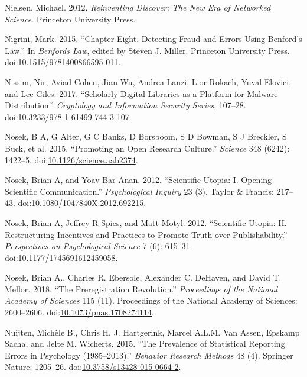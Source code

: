 \documentclass[a5paper]{book}
\begin{document}
\hypertarget{ref-isbn:9780691148908}{}
Nielsen, Michael. 2012. \emph{Reinventing Discover: The New Era of
Networked Science}. Princeton University Press.

\hypertarget{ref-doi:10.1515ux2f9781400866595-011}{}
Nigrini, Mark. 2015. ``Chapter Eight. Detecting Fraud and Errors Using
Benford's Law.'' In \emph{Benfords Law}, edited by Steven J. Miller.
Princeton University Press.
doi:\href{https://doi.org/10.1515/9781400866595-011}{10.1515/9781400866595-011}.

\hypertarget{ref-doi:10.3233ux2f978-1-61499-744-3-107}{}
Nissim, Nir, Aviad Cohen, Jian Wu, Andrea Lanzi, Lior Rokach, Yuval
Elovici, and Lee Giles. 2017. ``Scholarly Digital Libraries as a
Platform for Malware Distribution.'' \emph{Cryptology and Information
Security Series}, 107--28.
doi:\href{https://doi.org/10.3233/978-1-61499-744-3-107}{10.3233/978-1-61499-744-3-107}.

\hypertarget{ref-doi:10.1126ux2fscience.aab2374}{}
Nosek, B A, G Alter, G C Banks, D Borsboom, S D Bowman, S J Breckler, S
Buck, et al. 2015. ``Promoting an Open Research Culture.''
\emph{Science} 348 (6242): 1422--5.
doi:\href{https://doi.org/10.1126/science.aab2374}{10.1126/science.aab2374}.

\hypertarget{ref-doi:10.1080ux2f1047840X.2012.692215}{}
Nosek, Brian A, and Yoav Bar-Anan. 2012. ``Scientific Utopia: I. Opening
Scientific Communication.'' \emph{Psychological Inquiry} 23 (3). Taylor
\& Francis: 217--43.
doi:\href{https://doi.org/10.1080/1047840X.2012.692215}{10.1080/1047840X.2012.692215}.

\hypertarget{ref-doi:10.1177ux2f1745691612459058}{}
Nosek, Brian A, Jeffrey R Spies, and Matt Motyl. 2012. ``Scientific
Utopia: II. Restructuring Incentives and Practices to Promote Truth over
Publishability.'' \emph{Perspectives on Psychological Science} 7 (6):
615--31.
doi:\href{https://doi.org/10.1177/1745691612459058}{10.1177/1745691612459058}.

\hypertarget{ref-doi:10.1073ux2fpnas.1708274114}{}
Nosek, Brian A., Charles R. Ebersole, Alexander C. DeHaven, and David T.
Mellor. 2018. ``The Preregistration Revolution.'' \emph{Proceedings of
the National Academy of Sciences} 115 (11). Proceedings of the National
Academy of Sciences: 2600--2606.
doi:\href{https://doi.org/10.1073/pnas.1708274114}{10.1073/pnas.1708274114}.

\hypertarget{ref-doi:10.3758ux2fs13428-015-0664-2}{}
Nuijten, Michèle B., Chris H. J. Hartgerink, Marcel A.L.M. Van Assen,
Epskamp Sacha, and Jelte M. Wicherts. 2015. ``The Prevalence of
Statistical Reporting Errors in Psychology (1985--2013).''
\emph{Behavior Research Methods} 48 (4). Springer Nature: 1205--26.
doi:\href{https://doi.org/10.3758/s13428-015-0664-2}{10.3758/s13428-015-0664-2}.
\end{document}
